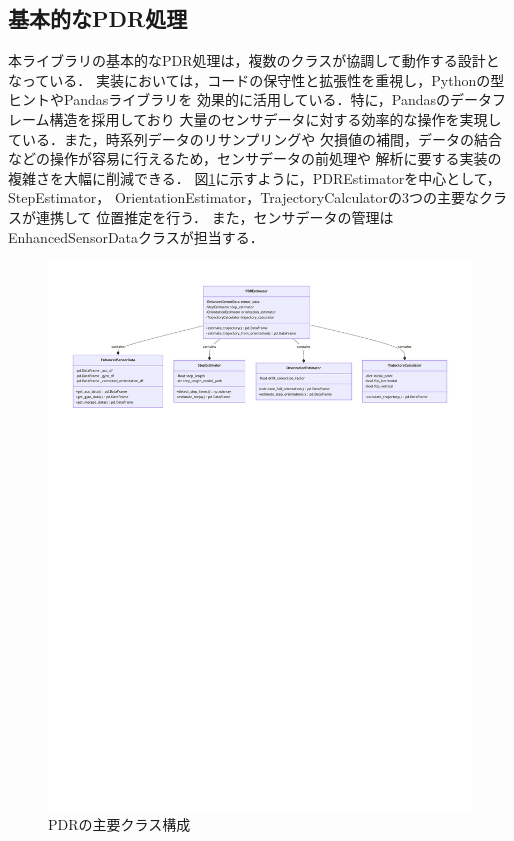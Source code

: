 
\subsection{基本的なPDR処理}

本ライブラリの基本的なPDR処理は，複数のクラスが協調して動作する設計となっている．
実装においては，コードの保守性と拡張性を重視し，Pythonの型ヒントやPandasライブラリを
効果的に活用している．特に，Pandasのデータフレーム構造を採用しており
大量のセンサデータに対する効率的な操作を実現している．また，時系列データのリサンプリングや
欠損値の補間，データの結合などの操作が容易に行えるため，センサデータの前処理や
解析に要する実装の複雑さを大幅に削減できる．
図\ref{fig:pdr-class}に示すように，PDREstimatorを中心として，StepEstimator，
OrientationEstimator，TrajectoryCalculatorの3つの主要なクラスが連携して
位置推定を行う．
また，センサデータの管理はEnhancedSensorDataクラスが担当する．

\begin{figure}[H]
    \centering
    \includegraphics[width=\linewidth]{../image/pdr-class-diagram.pdf}
    \caption{PDRの主要クラス構成}
    \label{fig:pdr-class}
\end{figure}

